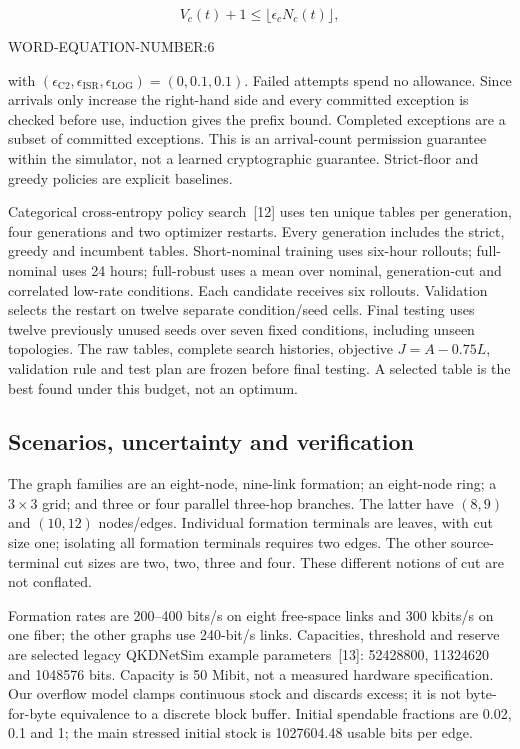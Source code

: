 \documentclass[conference,a4paper]{IEEEtran}
\begin{document}
\[
V_c(t)+1\leq\lfloor\epsilon_cN_c(t)\rfloor,
\]

WORD-EQUATION-NUMBER:6


with $(\epsilon_{\mathrm{C2}},\epsilon_{\mathrm{ISR}},\epsilon_{\mathrm{LOG}})=(0,0.1,0.1)$. Failed attempts spend no allowance. Since arrivals only increase the right-hand side and every committed exception is checked before use, induction gives the prefix bound. Completed exceptions are a subset of committed exceptions. This is an arrival-count permission guarantee within the simulator, not a learned cryptographic guarantee. Strict-floor and greedy policies are explicit baselines.

Categorical cross-entropy policy search~[12] uses ten unique tables per generation, four generations and two optimizer restarts. Every generation includes the strict, greedy and incumbent tables. Short-nominal training uses six-hour rollouts; full-nominal uses 24 hours; full-robust uses a mean over nominal, generation-cut and correlated low-rate conditions. Each candidate receives six rollouts. Validation selects the restart on twelve separate condition/seed cells. Final testing uses twelve previously unused seeds over seven fixed conditions, including unseen topologies. The raw tables, complete search histories, objective $J=A-0.75L$, validation rule and test plan are frozen before final testing. A selected table is the best found under this budget, not an optimum.

\subsection{Scenarios, uncertainty and verification}
The graph families are an eight-node, nine-link formation; an eight-node ring; a $3\times3$ grid; and three or four parallel three-hop branches. The latter have $(8,9)$ and $(10,12)$ nodes/edges. Individual formation terminals are leaves, with cut size one; isolating all formation terminals requires two edges. The other source-terminal cut sizes are two, two, three and four. These different notions of cut are not conflated.

Formation rates are 200--400 bits/s on eight free-space links and 300 kbits/s on one fiber; the other graphs use 240-bit/s links. Capacities, threshold and reserve are selected legacy QKDNetSim example parameters~[13]: 52428800, 11324620 and 1048576 bits. Capacity is 50 Mibit, not a measured hardware specification. Our overflow model clamps continuous stock and discards excess; it is not byte-for-byte equivalence to a discrete block buffer. Initial spendable fractions are 0.02, 0.1 and 1; the main stressed initial stock is 1027604.48 usable bits per edge.
\end{document}
